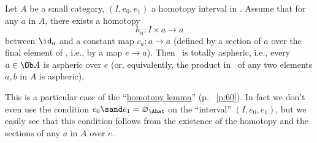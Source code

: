 \begin{proposition}
  Let $A$ be a small category, $(I, e_0,e_1)$ a homotopy interval in
  \Ahat. Assume that for any $a$ in $A$\kern1pt, there exists a homotopy
  \[h_a : I\times a\to a\]
  between $\id_a$ and a constant map $c_a:a\to a$ \textup(defined by a
  section of $a$ over the final element of \Ahat, i.e., by a map $e\to
  a$\textup). Then \Ahat\ is totally aspheric, i.e., every $a\in\Ob A$
  is aspheric over $e$ \textup(or, equivalently, the product in \Ahat\ of any
  two elements $a,b$ in $A$ is aspheric\textup).
\end{proposition}

This is a particular case of the
``\hyperref[lem:homotopylemma]{homotopy lemma}'' (p.~%
\ref{p:60}). In fact we don't even use the condition $e_0
\sand e_1 = \varnothing_\Ahat$ on the ``interval'' $(I,e_0,e_1)$, but we
easily see that this condition follows from the existence of the
homotopy and the sections of any $a$ in $A$ over $e$.

